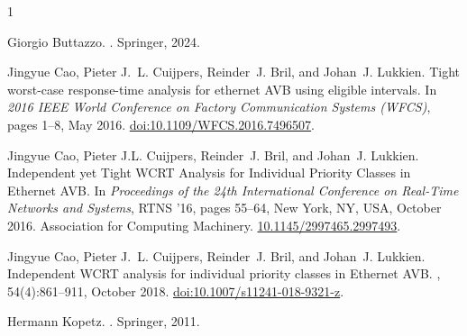 \documentclass[a4paper,11pt]{article}
\begin{document}

\begin{thebibliography}{1}

Giorgio Buttazzo.
.
\newblock Springer, 2024.

Jingyue Cao, Pieter J.~L. Cuijpers, Reinder~J. Bril, and Johan~J. Lukkien.
\newblock Tight worst-case response-time analysis for ethernet {{AVB}} using eligible intervals.
\newblock In {\em 2016 {{IEEE World Conference}} on {{Factory Communication Systems}} ({{WFCS}})}, pages 1--8, May 2016.
\newblock \url{doi:10.1109/WFCS.2016.7496507}.

Jingyue Cao, Pieter J.L. Cuijpers, Reinder~J. Bril, and Johan~J. Lukkien.
\newblock Independent yet {{Tight WCRT Analysis}} for {{Individual Priority Classes}} in {{Ethernet AVB}}.
\newblock In {\em Proceedings of the 24th {{International Conference}} on {{Real-Time Networks}} and {{Systems}}}, {{RTNS}} '16, pages 55--64, New York, NY, USA, October 2016. Association for Computing Machinery.
\newblock \url{10.1145/2997465.2997493}.

Jingyue Cao, Pieter J.~L. Cuijpers, Reinder~J. Bril, and Johan~J. Lukkien.
\newblock Independent {{WCRT}} analysis for individual priority classes in {{Ethernet AVB}}.
, 54(4):861--911, October 2018.
\newblock \url{doi:10.1007/s11241-018-9321-z}.

Hermann Kopetz.
.
\newblock Springer, 2011.

\end{thebibliography}
\end{document}
